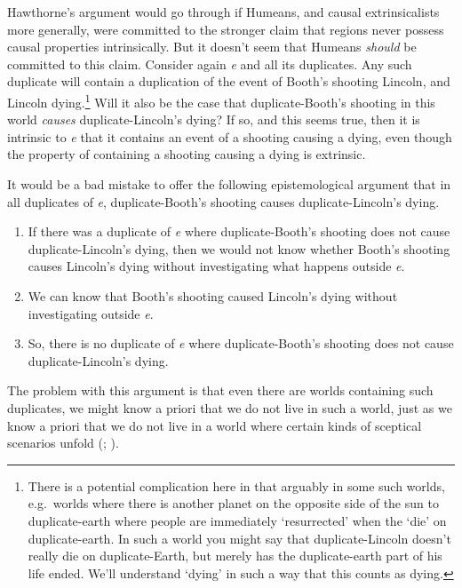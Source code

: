 \documentclass[
  10pt,
  letterpaper,
  DIV=11,
  numbers=noendperiod,
  twoside]{scrartcl}
\providecommand{\tightlist}{%
  \setlength{\itemsep}{0pt}\setlength{\parskip}{0pt}}\usepackage{longtable,booktabs,array}
\begin{document}
Hawthorne's argument would go through if Humeans, and causal
extrinsicalists more generally, were committed to the stronger claim
that regions never possess causal properties intrinsically. But it
doesn't seem that Humeans \emph{should} be committed to this claim.
Consider again \emph{e} and all its duplicates. Any such duplicate will
contain a duplication of the event of Booth's shooting Lincoln, and
Lincoln dying.\footnote{There is a potential complication here in that
  arguably in some such worlds, e.g.~worlds where there is another
  planet on the opposite side of the sun to duplicate-earth where people
  are immediately `resurrected' when the `die' on duplicate-earth. In
  such a world you might say that duplicate-Lincoln doesn't really die
  on duplicate-Earth, but merely has the duplicate-earth part of his
  life ended. We'll understand `dying' in such a way that this counts as
  dying.} Will it also be the case that duplicate-Booth's shooting in
this world \emph{causes} duplicate-Lincoln's dying? If so, and this
seems true, then it is intrinsic to \emph{e} that it contains an event
of a shooting causing a dying, even though the property of containing a
shooting causing a dying is extrinsic.

It would be a bad mistake to offer the following epistemological
argument that in all duplicates of \emph{e}, duplicate-Booth's shooting
causes duplicate-Lincoln's dying.

\begin{enumerate}
\def\labelenumi{\arabic{enumi}.}
\tightlist
\item
  If there was a duplicate of \emph{e} where duplicate-Booth's shooting
  does not cause duplicate-Lincoln's dying, then we would not know
  whether Booth's shooting causes Lincoln's dying without investigating
  what happens outside \emph{e}.
\item
  We can know that Booth's shooting caused Lincoln's dying without
  investigating outside \emph{e}.
\item
  So, there is no duplicate of \emph{e} where duplicate-Booth's shooting
  does not cause duplicate-Lincoln's dying.
\end{enumerate}

The problem with this argument is that even there are worlds containing
such duplicates, we might know a priori that we do not live in such a
world, just as we know a priori that we do not live in a world where
certain kinds of sceptical scenarios unfold
(;
).
\end{document}
